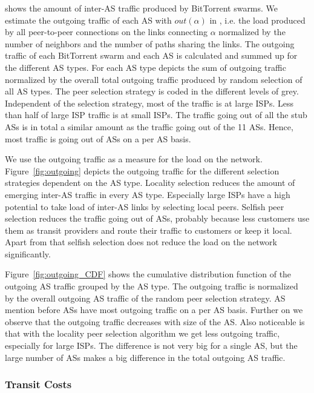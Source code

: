  shows the amount of inter-AS traffic produced by BitTorrent swarms. We estimate the outgoing traffic of each AS with $out(\alpha)$ in , i.e. the load produced by all peer-to-peer connections on the links connecting $\alpha$ normalized by the number of neighbors and the number of paths sharing the links. The outgoing traffic of each BitTorrent swarm and each AS is calculated and summed up for the different AS types. For each AS type  depicts the sum of outgoing traffic normalized by the overall total outgoing traffic produced by random selection of all AS types. The peer selection strategy is coded in the different levels of grey. Independent of the selection strategy, most of the traffic is at large ISPs. Less than half of large ISP traffic is at small ISPs. The traffic going out of all the stub ASs is in total a similar amount as the traffic going out of the 11 \tier ASs. Hence, most traffic is going out of \tier ASs on a per AS basis.

We use the outgoing traffic as a measure for the load on the network.
Figure~\ref{fig:outgoing} depicts the outgoing traffic for the different selection strategies dependent on the AS type. Locality selection reduces the amount of emerging inter-AS traffic in every AS type. Especially large ISPs have a high potential to take load of inter-AS links by selecting local peers. Selfish peer selection reduces the traffic going out of \tier ASs, probably because less customers use them as transit providers and route their traffic to customers or keep it local. Apart from that selfish selection does not reduce the load on the network significantly.

Figure~\ref{fig:outgoing_CDF} shows the cumulative distribution function of the outgoing AS traffic grouped by the AS type. The outgoing traffic is normalized by the overall outgoing AS traffic of the random peer selection strategy. AS mention before \tier ASs have most outgoing traffic on a per AS basis. Further on we observe that the outgoing traffic decreases with size of the AS. Also noticeable is that with the locality peer selection algorithm we get less outgoing traffic, especially for large ISPs. The difference is not very big for a single AS, but the large number of ASs makes a big difference in the total outgoing AS traffic.

\subsubsection{Transit Costs}


